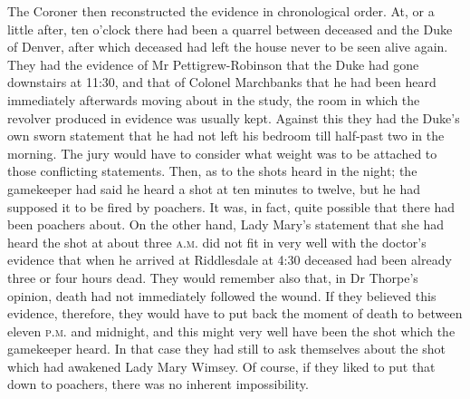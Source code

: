 The Coroner then reconstructed the evidence in chronological order.  At, or a little after, ten o'clock there had been a quarrel between deceased and the Duke of Denver, after which deceased had left the house never to be seen alive again. They had the evidence of Mr  Pettigrew-Robinson that the Duke had gone downstairs at 11:30, and that of Colonel Marchbanks that he had been heard immediately afterwards moving about in the study, the room in which the revolver produced in evidence was usually kept. Against this they had the Duke's own sworn statement that he had not left his bedroom till half-past two in the morning. The jury would have to consider what weight was to be attached to those conflicting statements. Then, as to the shots heard in the night; the gamekeeper had said he heard a shot at ten minutes to twelve, but he had supposed it to be fired by poachers. It was, in fact, quite possible that there had been poachers about. On the other hand, Lady Mary's statement that she had heard the shot at about three \textsc{a.m.} did not fit in very well with the doctor's evidence that when he arrived at Riddlesdale at 4:30 deceased had been already three or four hours dead. They would remember also that, in Dr Thorpe's opinion, death had not immediately followed the wound. If they believed this evidence, therefore, they would have to put back the moment of death to between eleven \textsc{p.m.} and midnight, and this might very well have been the shot which the gamekeeper heard. In that case they had still to ask themselves about the shot which had awakened Lady Mary Wimsey.  Of course, if they liked to put that down to poachers, there was no inherent impossibility.

